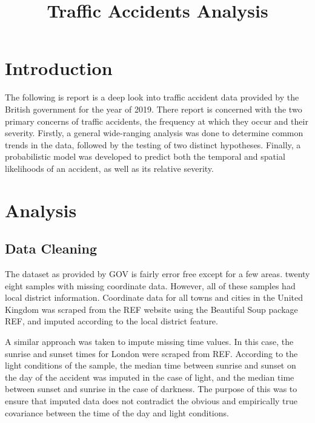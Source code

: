\documentclass[12pt]{article}
\title{Traffic Accidents Analysis}
\date{}
\begin{document}
\maketitle



\section{Introduction}

The following is report is a deep look into traffic accident data provided by the British government for the year of 2019. There report is concerned with the two primary concerns of traffic accidents, the frequency at which they occur and their severity. Firstly, a general wide-ranging analysis was done to determine common trends in the data, followed by the testing of two distinct hypotheses. Finally, a probabilistic model was developed to predict both the temporal and spatial likelihoods of an accident, as well as its relative severity.

\section{Analysis}

\subsection{Data Cleaning}

The dataset as provided by GOV is fairly error free except for a few areas. twenty eight samples with missing coordinate data. However, all of these samples had local district information. Coordinate data for all towns and cities in the United Kingdom was scraped from the REF website using the Beautiful Soup package REF, and imputed according to the local district feature. 

A similar approach was taken to impute missing time values. In this case, the sunrise and sunset times for London were scraped from REF. According to the light conditions of the sample, the median time between sunrise and sunset on the day of the accident was imputed in the case of light, and the median time between sunset and sunrise in the case of darkness. The purpose of this was to ensure that imputed data does not contradict the obvious and empirically true covariance between the time of the day and light conditions.
\end{document}
